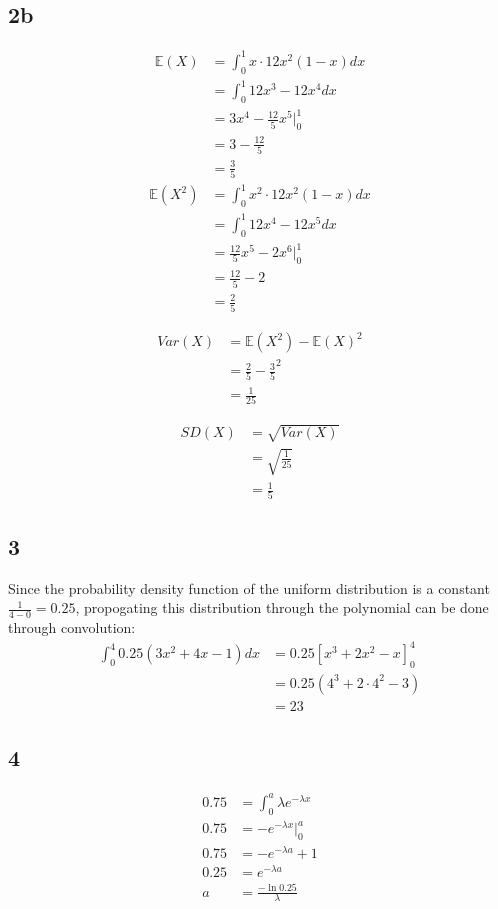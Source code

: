 \documentclass{article}
\begin{document}
\subsection*{2b}
\begin{align*}
	\mathbb{E}(X) &= \int_{0}^{1} x\cdot12x^2(1-x)dx \\
								&= \int_{0}^{1} 12x^3-12x^4dx\\
								&= 3x^4 - \frac{12}{5}x^5 \Big|_0^1\\
								&= 3 - \frac{12}{5}\\
								&= \frac{3}{5}
\end{align*}
\begin{align*}
	\mathbb{E}(X^2) &= \int_{0}^{1} x^2\cdot12x^2(1-x)dx \\
								  &= \int_{0}^{1} 12x^4-12x^5dx\\
									&= \frac{12}{5}x^5 - 2x^6 \Big|_0^1\\
									&= \frac{12}{5} - 2\\
									&= \frac{2}{5}
\end{align*}

\begin{align*}
	Var(X) &= \mathbb{E}(X^2) - \mathbb{E}(X)^2 \\
				 &= \frac{2}{5} - \frac{3}{5}^2 \\
				 &= \frac{1}{25}
\end{align*}

\begin{align*}
	SD(X) &= \sqrt{Var(X)}\\
	&= \sqrt{\frac{1}{25}}\\
	&= \frac{1}{5}
\end{align*}

\subsection*{3}
Since the probability density function of the uniform distribution is a constant
$\frac{1}{4-0} = 0.25$, propogating this distribution through the polynomial can
be done through convolution:
\begin{align*}
	\int_{0}^{4}0.25(3x^2 + 4x - 1)dx &= 0.25\left[x^3 + 2x^2 -x \right]^4_0\\
																		&= 0.25(4^3 + 2\cdot 4^2 - 3)\\
																		&= 23
\end{align*}


\subsection*{4}
\begin{align*}
	0.75 &= \int_0^a \lambda e ^{-\lambda x}\\
	0.75 &= -e ^{-\lambda x}\Big|_0^a\\
	0.75 &= -e^{-\lambda a} + 1\\
	0.25 &= e^{-\lambda a}\\
	a &= \frac{-\ln 0.25}{\lambda}
\end{align*}
\end{document}
